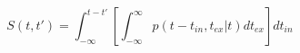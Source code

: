 \begin{equation}
S(t,t') = \int_{-\infty}^{t-t'} \left[ \int_{-\infty}^\infty p(t-t_{in},t_{ex}|t) dt_{ex}\right] dt_{in}
\end{equation}